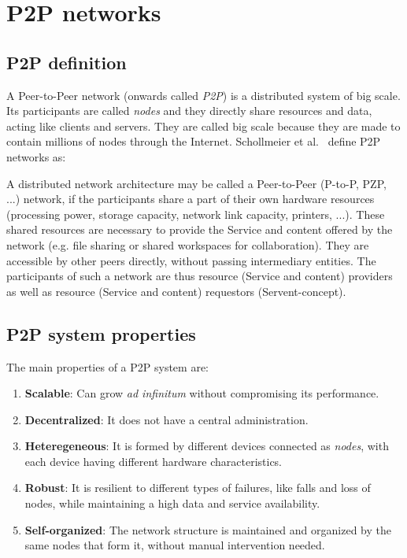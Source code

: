 %

\section{P2P networks}
\subsection{P2P definition}
\label{sec:p2p_definition}

A Peer-to-Peer network (onwards called \textit{P2P}) is a distributed system of
big scale. Its participants
are called \textit{nodes} and they directly share resources and data, acting
like clients and servers. They are called big scale because they are made to
contain millions of nodes through the Internet. Schollmeier et al.~\cite{conf_p2p_Schollmeier01} define P2P networks as:

\begin{mydef}
A distributed network architecture may be called a Peer-to-Peer (P-to-P, PZP,
...) network, if the participants share a part of their own hardware resources (processing power, storage capacity, network link capacity, printers, ...). 
These shared resources are necessary to provide the Service and content offered
by the network (e.g.  file sharing or shared workspaces for collaboration).
They are accessible by other peers directly, without passing intermediary
entities. The participants of such a network are thus resource (Service and
content) providers as well as resource (Service and content) requestors
(Servent-concept).
\end{mydef}

\subsection{P2P system properties}
\label{sec:p2p_characteristics}

The main properties of a P2P system are:
\begin{enumerate}
    \item \textbf{Scalable}: Can grow \textit{ad infinitum} without compromising its performance.
    \item \textbf{Decentralized}: It does not have a central administration.
    \item \textbf{Heteregeneous}: It is formed by different devices
connected as \textit{nodes}, with each device having different hardware characteristics.
    \item \textbf{Robust}: It is resilient to different types of failures, like
falls and loss of nodes, while maintaining a high data and service availability.
    \item \textbf{Self-organized}: The network structure is maintained and organized by the same nodes that form it, without manual intervention needed.
\end{enumerate}

